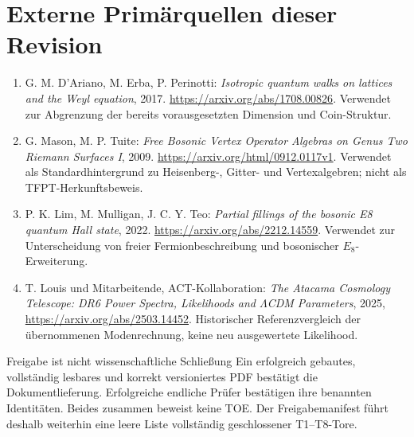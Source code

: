 \section{Externe Primärquellen dieser Revision}
\begin{enumerate}
\item[V16-E1] G. M. D'Ariano, M. Erba, P. Perinotti: \emph{Isotropic quantum walks on lattices and the Weyl equation}, 2017. \url{https://arxiv.org/abs/1708.00826}. Verwendet zur Abgrenzung der bereits vorausgesetzten Dimension und Coin-Struktur.
\item[V16-E2] G. Mason, M. P. Tuite: \emph{Free Bosonic Vertex Operator Algebras on Genus Two Riemann Surfaces I}, 2009. \url{https://arxiv.org/html/0912.0117v1}. Verwendet als Standardhintergrund zu Heisenberg-, Gitter- und Vertexalgebren; nicht als TFPT-Herkunftsbeweis.
\item[V16-E3] P. K. Lim, M. Mulligan, J. C. Y. Teo: \emph{Partial fillings of the bosonic E8 quantum Hall state}, 2022. \url{https://arxiv.org/abs/2212.14559}. Verwendet zur Unterscheidung von freier Fermionbeschreibung und bosonischer $E_8$-Erweiterung.
\item[V16-E4] T. Louis und Mitarbeitende, ACT-Kollaboration: \emph{The Atacama Cosmology Telescope: DR6 Power Spectra, Likelihoods and $\Lambda$CDM Parameters}, 2025, \url{https://arxiv.org/abs/2503.14452}. Historischer Referenzvergleich der übernommenen Modenrechnung, keine neu ausgewertete Likelihood.
\end{enumerate}
\begin{grenze}{Freigabe ist nicht wissenschaftliche Schließung}
Ein erfolgreich gebautes, vollständig lesbares und korrekt versioniertes PDF bestätigt die Dokumentlieferung. Erfolgreiche endliche Prüfer bestätigen ihre benannten Identitäten. Beides zusammen beweist keine TOE. Der Freigabemanifest führt deshalb weiterhin eine leere Liste vollständig geschlossener T1--T8-Tore.
\end{grenze}
